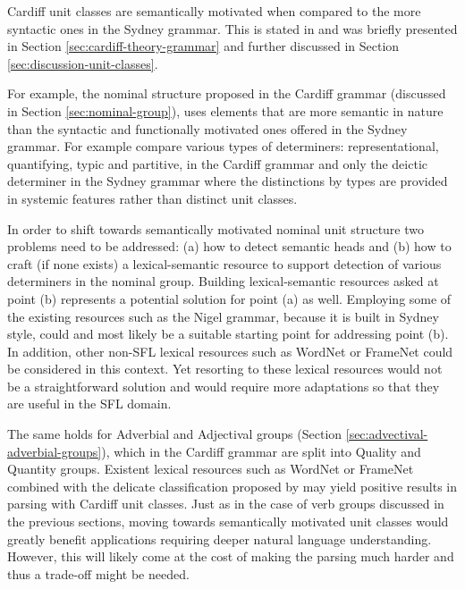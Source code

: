     Cardiff unit classes are semantically motivated when compared to the more syntactic ones in the Sydney grammar. This is stated in \citet[193--194]{Fawcett2000} and was briefly presented in Section \ref{sec:cardiff-theory-grammar} and further discussed in Section \ref{sec:discussion-unit-classes}.

    For example, the nominal structure proposed in the Cardiff grammar (discussed in Section \ref{sec:nominal-group}), uses elements that are more semantic in nature than the syntactic and functionally motivated ones offered in the Sydney grammar. For example compare various types of determiners: representational, quantifying, typic and partitive, in the Cardiff grammar and only the deictic determiner in the Sydney grammar where the distinctions by types are provided in systemic features rather than distinct unit classes. 
    
    In order to shift towards semantically motivated nominal unit structure two problems need to be addressed: (a) how to detect semantic heads and (b) how to craft (if none exists) a lexical-semantic resource to support detection of various determiners in the nominal group. Building lexical-semantic resources asked at point (b) represents a potential solution for point (a) as well. Employing some of the existing resources such as the Nigel grammar, because it is built in Sydney style, could and most likely be a suitable starting point for addressing point (b). In addition, other non-SFL lexical resources such as WordNet \citep{Miller1995} or FrameNet \citep{Baker1998} could be considered in this context. Yet resorting to these lexical resources would not be a straightforward solution and would require more adaptations so that they are useful in the SFL domain.   

    The same holds for Adverbial and Adjectival groups (Section \ref{sec:advectival-adverbial-groups}), which in the Cardiff grammar are split into Quality and Quantity groups. Existent lexical resources such as WordNet \citep{Miller1995} or FrameNet\citep{Baker1998} combined with the delicate classification proposed by \citet{Tucker1997} may yield positive results in parsing with Cardiff unit classes. 
    Just as in the case of verb groups discussed in the previous sections, moving towards semantically motivated unit classes would greatly benefit applications requiring deeper natural language understanding. However, this will likely come at the cost of making the parsing much harder and thus a trade-off might be needed. 

